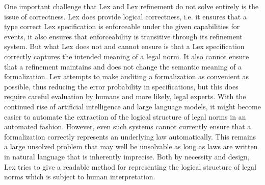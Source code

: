 One important challenge that Lex and Lex refinement do not
solve entirely is the issue of correctness.
Lex does provide logical correctness, i.e. it ensures that
a type correct Lex specification is enforceable under the
given capabilities for events, it also ensures that enforceability
is transitive through its refinement system.
But what Lex does not and cannot ensure is
that a Lex specification correctly captures the intended
meaning of a legal norm.
It also cannot ensure that a refinement maintains and
does not change the semantic meaning of a formalization.
Lex attempts to make auditing a formalization as convenient
as possible, thus reducing the error probability
in specifications, but this does require careful
evaluation by humans and more likely, legal experts.
With the continued rise of artificial intelligence
and large language models, it might become easier
to automate the extraction of the logical structure
of legal norms in an automated fashion.
However, even such systems cannot currently ensure
that a formalization correctly represents an underlying law
automatically.
This remains a large unsolved problem that may well be
unsolvable as long as laws are written in natural language
that is inherently imprecise.
Both by necessity and design, Lex tries
to give a readable method for representing the
logical structure of legal norms which is subject
to human interpretation.


